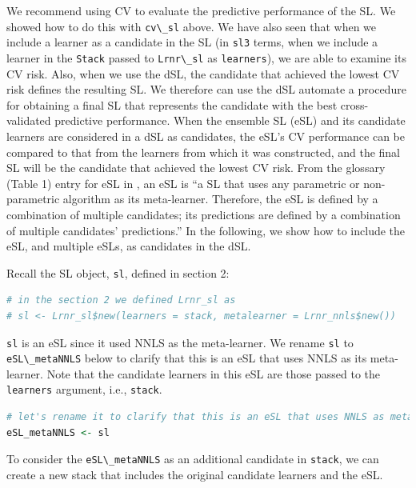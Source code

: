 \documentclass[
  12pt, krantz2,
]{krantz}
\newcommand{\passthrough}[1]{#1}
\newcommand{\1}{\mathbbm{1}}
\theoremstyle{definition}
\theoremstyle{definition}
\theoremstyle{definition}
\theoremstyle{definition}
\theoremstyle{remark}
\begin{document}
We recommend using CV to evaluate the predictive performance of the SL. We
showed how to do this with \passthrough{\lstinline!cv\_sl!} above. We have also seen that when we
include a learner as a candidate in the SL (in \passthrough{\lstinline!sl3!} terms, when we include a
learner in the \passthrough{\lstinline!Stack!} passed to \passthrough{\lstinline!Lrnr\_sl!} as \passthrough{\lstinline!learners!}), we are able to
examine its CV risk. Also, when we use the dSL, the candidate that achieved the
lowest CV risk defines the resulting SL. We therefore can use the dSL automate
a procedure for obtaining a final SL that represents the candidate with the
best cross-validated predictive performance. When the ensemble SL (eSL) and
its candidate learners are considered in a dSL as candidates, the eSL's CV
performance can be compared to that from the learners from which it was
constructed, and the final SL will be the candidate that achieved the lowest CV
risk. From the glossary (Table 1) entry for eSL in \citet{rvp2022super}, an
eSL is ``a SL that uses any parametric or non-parametric algorithm as its
meta-learner. Therefore, the eSL is defined by a combination of multiple
candidates; its predictions are defined by a combination of multiple candidates'
predictions.'' In the following, we show how to include the eSL, and multiple
eSLs, as candidates in the dSL.

Recall the SL object, \passthrough{\lstinline!sl!}, defined in section 2:

\begin{lstlisting}[language=R]
# in the section 2 we defined Lrnr_sl as
# sl <- Lrnr_sl$new(learners = stack, metalearner = Lrnr_nnls$new())
\end{lstlisting}

\passthrough{\lstinline!sl!} is an eSL since it used NNLS as the meta-learner. We rename \passthrough{\lstinline!sl!} to
\passthrough{\lstinline!eSL\_metaNNLS!} below to clarify that this is an eSL that uses NNLS as its
meta-learner. Note that the candidate learners in this eSL are those passed
to the \passthrough{\lstinline!learners!} argument, i.e., \passthrough{\lstinline!stack!}.

\begin{lstlisting}[language=R]
# let's rename it to clarify that this is an eSL that uses NNLS as meta-learner
eSL_metaNNLS <- sl
\end{lstlisting}

To consider the \passthrough{\lstinline!eSL\_metaNNLS!} as an additional candidate in \passthrough{\lstinline!stack!}, we can
create a new stack that includes the original candidate learners and the eSL.
\end{document}
